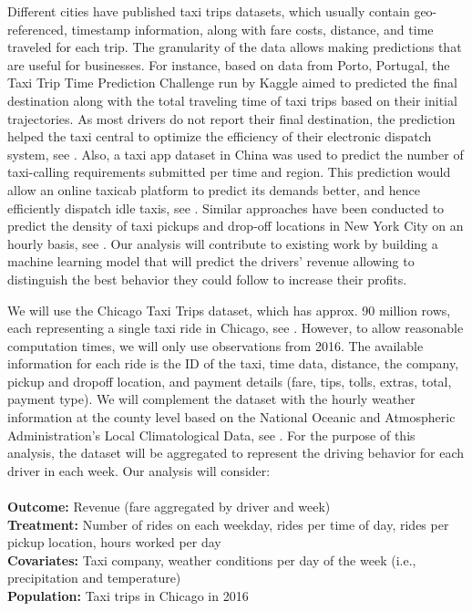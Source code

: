 \documentclass[twoside,11pt]{article}
\begin{document}
Different cities have published taxi trips datasets, which usually contain geo-referenced, timestamp information, along with fare costs, distance, and time traveled for each trip. The granularity of the data allows making predictions that are useful for businesses. For instance, based on data from Porto, Portugal, the Taxi Trip Time Prediction Challenge run by Kaggle aimed to predicted the final destination along with the total traveling time of taxi trips based on their initial trajectories. As most drivers do not report their final destination, the prediction helped the taxi central to optimize the efficiency of their electronic dispatch system, see \cite{TaxiTravelTime}. Also, a taxi app dataset in China was used to predict the number of taxi-calling requirements submitted per time and region. This prediction would allow an online taxicab platform to predict its demands better, and hence efficiently dispatch idle taxis, see \cite{TaxiDemand2}. Similar approaches have been conducted to predict the density of taxi pickups and drop-off locations in New York City on an hourly basis, see \cite{NYCTaxi}. Our analysis will contribute to existing work by building a machine learning model that will predict the drivers' revenue allowing to distinguish the best behavior they could follow to increase their profits.\par

We will use the Chicago Taxi Trips dataset, which has approx. 90 million rows, each representing a single taxi ride in Chicago, see \cite{ChicagoDataPortal}. However, to allow reasonable computation times, we will only use observations from 2016. The available information for each ride is the ID of the taxi, time data, distance, the company, pickup and dropoff location, and payment details (fare, tips, tolls, extras, total, payment type). We will complement the dataset with the hourly weather information at the county level based on the National Oceanic and Atmospheric Administration's Local Climatological Data, see \cite{NOAA}. For the purpose of this analysis, the dataset will be aggregated to represent the driving behavior for each driver in each week. Our analysis will consider:\\ \\
\textbf{Outcome:} Revenue (fare aggregated by driver and week)\\
\textbf{Treatment:} Number of rides on each weekday, rides per time of day, rides per pickup location, hours worked per day\\
\textbf{Covariates:} Taxi company, weather conditions per day of the week (i.e., precipitation and temperature)\\ 
\textbf{Population:} Taxi trips in Chicago in 2016\par
\end{document}
